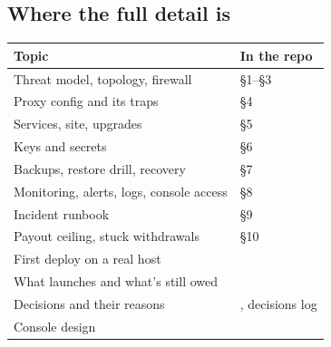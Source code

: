 \documentclass[11pt]{article}
\begin{document}
\subsection{Where the full detail is}

\begingroup\small
\begin{longtable}{@{}L{6.4cm}L{9.2cm}@{}}
\toprule
\textbf{Topic} & \textbf{In the repo} \\
\midrule
\endhead
Threat model, topology, firewall &  \S1--\S3 \\
Proxy config and its traps & \S4 \\
Services, site, upgrades & \S5 \\
Keys and secrets & \S6 \\
Backups, restore drill, recovery & \S7 \\
Monitoring, alerts, logs, console access & \S8 \\
Incident runbook & \S9 \\
Payout ceiling, stuck withdrawals & \S10 \\
First deploy on a real host &  \\
What launches and what's still owed &  \\
Decisions and their reasons & , decisions log \\
Console design &  \\
\bottomrule
\end{longtable}
\endgroup
\end{document}
